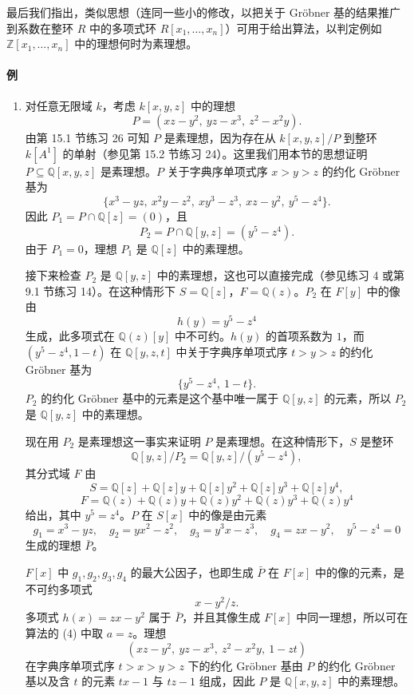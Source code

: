 最后我们指出，类似思想（连同一些小的修改，以把关于 Gröbner 基的结果推广到系数在整环 $R$ 中的多项式环 $R[x_1,\ldots,x_n]$）可用于给出算法，以判定例如 $\mathbb Z[x_1,\ldots,x_n]$ 中的理想何时为素理想。

\paragraph{例}
\begin{enumerate}[label=(\arabic*)]
	\item 对任意无限域 $k$，考虑 $k[x,y,z]$ 中的理想
	\[
	P=(xz-y^2,\ yz-x^3,\ z^2-x^2y).
	\]
	由第 15.1 节练习 26 可知 $P$ 是素理想，因为存在从 $k[x,y,z]/P$ 到整环 $k[A^1]$ 的单射（参见第 15.2 节练习 24）。这里我们用本节的思想证明 $P\subseteq\mathbb Q[x,y,z]$ 是素理想。$P$ 关于字典序单项式序 $x>y>z$ 的约化 Gröbner 基为
	\[
	\{x^3-yz,\ x^2y-z^2,\ xy^3-z^3,\ xz-y^2,\ y^5-z^4\}.
	\]
	因此 $P_1=P\cap\mathbb Q[z]=(0)$，且
	\[
	P_2=P\cap\mathbb Q[y,z]=(y^5-z^4).
	\]
	由于 $P_1=0$，理想 $P_1$ 是 $\mathbb Q[z]$ 中的素理想。
	
	接下来检查 $P_2$ 是 $\mathbb Q[y,z]$ 中的素理想，这也可以直接完成（参见练习 4 或第 9.1 节练习 14）。在这种情形下 $S=\mathbb Q[z]$，$F=\mathbb Q(z)$。$P_2$ 在 $F[y]$ 中的像由
	\[
	h(y)=y^5-z^4
	\]
	生成，此多项式在 $\mathbb Q(z)[y]$ 中不可约。$h(y)$ 的首项系数为 $1$，而 $(y^5-z^4,1-t)$ 在 $\mathbb Q[y,z,t]$ 中关于字典序单项式序 $t>y>z$ 的约化 Gröbner 基为
	\[
	\{y^5-z^4,\ 1-t\}.
	\]
	$P_2$ 的约化 Gröbner 基中的元素是这个基中唯一属于 $\mathbb Q[y,z]$ 的元素，所以 $P_2$ 是 $\mathbb Q[y,z]$ 中的素理想。
	
	现在用 $P_2$ 是素理想这一事实来证明 $P$ 是素理想。在这种情形下，$S$ 是整环
	\[
	\mathbb Q[y,z]/P_2=\mathbb Q[y,z]/(y^5-z^4),
	\]
	其分式域 $F$ 由
	\[
	S=\mathbb Q[z]+\mathbb Q[z]y+\mathbb Q[z]y^2+\mathbb Q[z]y^3+\mathbb Q[z]y^4,
	\]
	\[
	F=\mathbb Q(z)+\mathbb Q(z)y+\mathbb Q(z)y^2+\mathbb Q(z)y^3+\mathbb Q(z)y^4
	\]
	给出，其中 $y^5=z^4$。$P$ 在 $S[x]$ 中的像是由元素
	\[
	g_1=x^3-yz,
	\quad
	g_2=yx^2-z^2,
	\quad
	g_3=y^3x-z^3,
	\quad
	g_4=zx-y^2,
	\quad
	y^5-z^4=0
	\]
	生成的理想 $\bar P$。
	
	$F[x]$ 中 $g_1,g_2,g_3,g_4$ 的最大公因子，也即生成 $\bar P$ 在 $F[x]$ 中的像的元素，是不可约多项式
	\[
	x-y^2/z.
	\]
	多项式 $h(x)=zx-y^2$ 属于 $\bar P$，并且其像生成 $F[x]$ 中同一理想，所以可在算法的 (4) 中取 $a=z$。理想
	\[
	(xz-y^2,\ yz-x^3,\ z^2-x^2y,\ 1-zt)
	\]
	在字典序单项式序 $t>x>y>z$ 下的约化 Gröbner 基由 $P$ 的约化 Gröbner 基以及含 $t$ 的元素 $tx-1$ 与 $tz-1$ 组成，因此 $P$ 是 $\mathbb Q[x,y,z]$ 中的素理想。
	

\end{enumerate}
